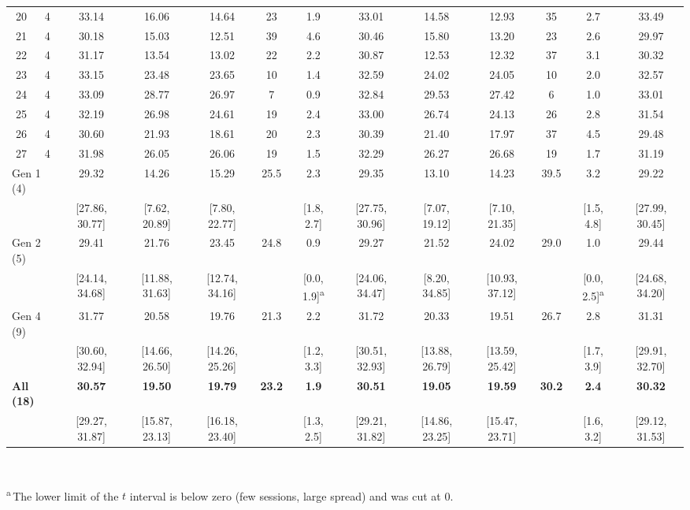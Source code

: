 \begin{table}[htbp]
{\begin{tabular}{cc ccccc ccccc c}
    20 & 4 & 33.14 & 16.06 & 14.64 & 23 & 1.9 & 33.01 & 14.58 & 12.93 & 35 & 2.7 & 33.49 \\
    21 & 4 & 30.18 & 15.03 & 12.51 & 39 & 4.6 & 30.46 & 15.80 & 13.20 & 23 & 2.6 & 29.97 \\
    22 & 4 & 31.17 & 13.54 & 13.02 & 22 & 2.2 & 30.87 & 12.53 & 12.32 & 37 & 3.1 & 30.32 \\
    23 & 4 & 33.15 & 23.48 & 23.65 & 10 & 1.4 & 32.59 & 24.02 & 24.05 & 10 & 2.0 & 32.57 \\
    24 & 4 & 33.09 & 28.77 & 26.97 & 7 & 0.9 & 32.84 & 29.53 & 27.42 & 6 & 1.0 & 33.01 \\
    25 & 4 & 32.19 & 26.98 & 24.61 & 19 & 2.4 & 33.00 & 26.74 & 24.13 & 26 & 2.8 & 31.54 \\
    26 & 4 & 30.60 & 21.93 & 18.61 & 20 & 2.3 & 30.39 & 21.40 & 17.97 & 37 & 4.5 & 29.48 \\
    27 & 4 & 31.98 & 26.05 & 26.06 & 19 & 1.5 & 32.29 & 26.27 & 26.68 & 19 & 1.7 & 31.19 \\
    \midrule
    \multicolumn{2}{l}{Gen 1 (4)} & 29.32 & 14.26 & 15.29 & 25.5 & 2.3 & 29.35 & 13.10 & 14.23 & 39.5 & 3.2 & 29.22 \\
      & & [27.86, 30.77] & [7.62, 20.89] & [7.80, 22.77] & & [1.8, 2.7] & [27.75, 30.96] & [7.07, 19.12] & [7.10, 21.35] & & [1.5, 4.8] & [27.99, 30.45] \\
    \multicolumn{2}{l}{Gen 2 (5)} & 29.41 & 21.76 & 23.45 & 24.8 & 0.9 & 29.27 & 21.52 & 24.02 & 29.0 & 1.0 & 29.44 \\
      & & [24.14, 34.68] & [11.88, 31.63] & [12.74, 34.16] & & [0.0, 1.9]\textsuperscript{a} & [24.06, 34.47] & [8.20, 34.85] & [10.93, 37.12] & & [0.0, 2.5]\textsuperscript{a} & [24.68, 34.20] \\
    \multicolumn{2}{l}{Gen 4 (9)} & 31.77 & 20.58 & 19.76 & 21.3 & 2.2 & 31.72 & 20.33 & 19.51 & 26.7 & 2.8 & 31.31 \\
      & & [30.60, 32.94] & [14.66, 26.50] & [14.26, 25.26] & & [1.2, 3.3] & [30.51, 32.93] & [13.88, 26.79] & [13.59, 25.42] & & [1.7, 3.9] & [29.91, 32.70] \\
    \midrule
    \multicolumn{2}{l}{\textbf{All (18)}} & \textbf{30.57} & \textbf{19.50} & \textbf{19.79} & \textbf{23.2} & \textbf{1.9} & \textbf{30.51} & \textbf{19.05} & \textbf{19.59} & \textbf{30.2} & \textbf{2.4} & \textbf{30.32} \\
      & & [29.27, 31.87] & [15.87, 23.13] & [16.18, 23.40] & & [1.3, 2.5] & [29.21, 31.82] & [14.86, 23.25] & [15.47, 23.71] & & [1.6, 3.2] & [29.12, 31.53] \\
    \bottomrule
  \end{tabular}}\\[1mm]
  \parbox{0.95\linewidth}{\footnotesize \textsuperscript{a}\,The lower limit of
  the $t$ interval is below zero (few sessions, large spread) and was cut at 0.}
\end{table}

